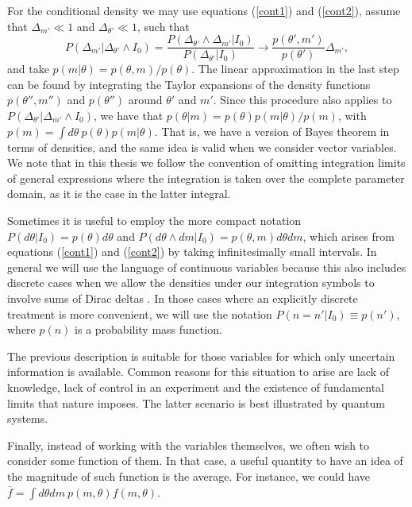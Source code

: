 For the conditional density we may use equations (\ref{cont1}) and (\ref{cont2}), assume that $\Delta_{m'} \ll 1$ and $\Delta_{\theta'} \ll 1$, such that 
\begin{equation}
P( \Delta_{m'} | \Delta_{\theta'} \land I_0 )= \frac{P( \Delta_{\theta'} \land \Delta_{m'} | I_0 )}{P(\Delta_{\theta'}| I_0)} \rightarrow \frac{p(\theta', m')}{p(\theta')}\Delta_{m'},
\end{equation}
and take $p(m|\theta) = p(\theta, m)/p(\theta)$. The linear approximation in the last step can be found by integrating the Taylor expansions of the density functions $p(\theta'', m'')$ and $p(\theta'')$ around $\theta'$ and $m'$. Since this procedure also applies to $P(\Delta_{\theta'} |\Delta_{m'} \land I_0 )$, we have that $p(\theta|m) = p(\theta) p(m|\theta)/p(m)$, with $p(m)=\int d\theta ~p(\theta) p(m|\theta)$. That is, we have a version of Bayes theorem in terms of densities, and the same idea is valid when we consider vector variables. We note that in this thesis we follow the convention of omitting integration limits of general expressions where the integration is taken over the complete parameter domain, as it is the case in the latter integral. 

Sometimes it is useful to employ the more compact notation $P(d\theta| I_0 ) = p(\theta)d\theta$ and $P(d\theta \land dm | I_0) = p(\theta, m)d\theta dm$, which arises from equations (\ref{cont1}) and (\ref{cont2}) by taking infinitesimally small intervals. In general we will use the language of continuous variables because this also includes discrete cases when we allow the densities under our integration symbols to involve sums of Dirac deltas \citep{jaynes2003, breuer2002}. In those cases where an explicitly discrete treatment is more convenient, we will use the notation $P(n = n' | I_0 ) \equiv p(n')$, where $p(n)$ is a probability mass function. 

The previous description is suitable for those variables for which only uncertain information is available. Common reasons for this situation to arise are lack of knowledge, lack of control in an experiment and the existence of fundamental limits that nature imposes. The latter scenario is best illustrated by quantum systems. 

Finally, instead of working with the variables themselves, we often wish to consider some function of them. In that case, a useful quantity to have an idea of the magnitude of such function is the average. For instance, we could have $\bar{f} = \int d\theta dm~ p(m,\theta) f(m, \theta)$. 

